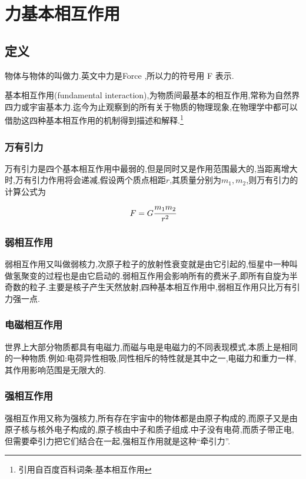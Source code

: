 \section{力\quad 基本相互作用}
\subsection{定义}
物体与物体的叫做力.英文中力是Force ,所以力的符号用 F 表示.

基本相互作用(fundamental interaction),为物质间最基本的相互作用,常称为{\heiti 自然界四力}或{\heiti 宇宙基本力}.迄今为止观察到的所有关于物质的物理现象,在物理学中都可以借肋这四种基本相互作用的机制得到描述和解释.\footnote{引用自百度百科词条:基本相互作用}

\subsubsection{万有引力}

万有引力是四个基本相互作用中最弱的,但是同时又是作用范围最大的,当距离增大时,万有引力作用将会递减,假设两个质点相距$r$,其质量分别为$m_1,m_2$,则万有引力的计算公式为
\begin{equation}
  F=G\cfrac{m_1m_2}{r^2}
\end{equation}

\subsubsection{弱相互作用}

弱相互作用又叫做弱核力,次原子粒子的放射性衰变就是由它引起的,恒星中一种叫做氢聚变的过程也是由它启动的.弱相互作用会影响所有的费米子,即所有自旋为半奇数的粒子.主要是核子产生天然放射,四种基本相互作用中,弱相互作用只比万有引力强一点.

\subsubsection{电磁相互作用}

世界上大部分物质都具有电磁力,而磁与电是电磁力的不同表现模式,本质上是相同的一种物质.例如:电荷异性相吸,同性相斥的特性就是其中之一,电磁力和重力一样,其作用影响范围是无限大的.

\subsubsection{强相互作用}
强相互作用又称为强核力,所有存在宇宙中的物体都是由原子构成的,而原子又是由原子核与核外电子构成的,原子核由中子和质子组成.中子没有电荷,而质子带正电,但需要牵引力把它们结合在一起,强相互作用就是这种``牵引力''.

